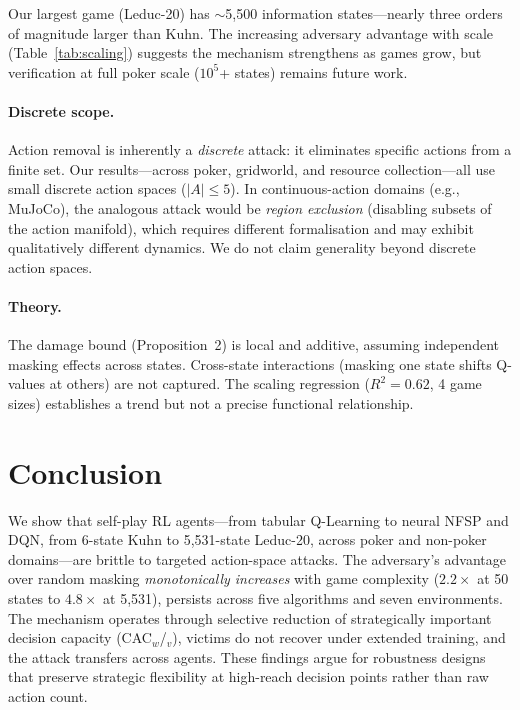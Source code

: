 \documentclass{article}
\begin{document}
Our largest game (Leduc-20) has $\sim$5,500 information states---nearly three orders of magnitude larger than Kuhn. The increasing adversary advantage with scale (Table~\ref{tab:scaling}) suggests the mechanism strengthens as games grow, but verification at full poker scale ($10^5$+ states) remains future work.

\paragraph{Discrete scope.}
Action removal is inherently a \emph{discrete} attack: it eliminates specific actions from a finite set. Our results---across poker, gridworld, and resource collection---all use small discrete action spaces ($|A| \leq 5$). In continuous-action domains (e.g., MuJoCo), the analogous attack would be \emph{region exclusion} (disabling subsets of the action manifold), which requires different formalisation and may exhibit qualitatively different dynamics. We do not claim generality beyond discrete action spaces.

\paragraph{Theory.}
The damage bound (Proposition~2) is local and additive, assuming independent masking effects across states. Cross-state interactions (masking one state shifts Q-values at others) are not captured. The scaling regression ($R^2 = 0.62$, 4 game sizes) establishes a trend but not a precise functional relationship.

\section{Conclusion}

We show that self-play RL agents---from tabular Q-Learning to neural NFSP and DQN, from 6-state Kuhn to 5,531-state Leduc-20, across poker and non-poker domains---are brittle to targeted action-space attacks. The adversary's advantage over random masking \emph{monotonically increases} with game complexity ($2.2\times$ at 50 states to $4.8\times$ at 5,531), persists across five algorithms and seven environments. The mechanism operates through selective reduction of strategically important decision capacity (CAC$_w$/$_v$), victims do not recover under extended training, and the attack transfers across agents. These findings argue for robustness designs that preserve strategic flexibility at high-reach decision points rather than raw action count.
\end{document}
